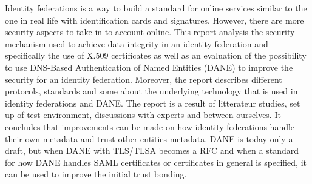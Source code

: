 Identity federations is a way to build a standard for online services similar to the one in real life with identification cards and signatures.
However, there are more security aspects to take in to account online.
This report analysis the security mechanism used to achieve data integrity in an identity federation and specifically the use of X.509 certificates as well as an evaluation of the possibility to use DNS-Based Authentication of Named Entities (DANE) to improve the security for an identity federation.
Moreover, the report describes different protocols, standards and some about the underlying technology that is used in identity federations and DANE. 
The report is a result of litterateur studies, set up of test environment, discussions with experts and between ourselves.
It concludes that improvements can be made on how identity federations handle their own metadata and trust other entities metadata. 
DANE is today only a draft, but when DANE with TLS/TLSA becomes a RFC and when a standard for how DANE handles SAML certificates
or certificates in general is specified, it can be used to improve the initial trust bonding.





